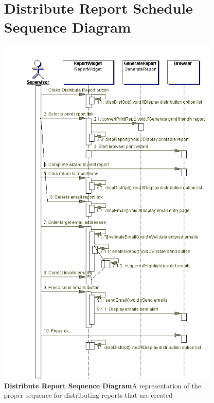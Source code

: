 \documentclass[letterpaper,12pt]{report}
\begin{document}
\begin{figure}[hbp]
 \section{Distribute Report Schedule Sequence Diagram}
 \includegraphics[scale=0.8]{externals/DistributeReportSequence.png}
 \caption{\small
\textbf{Distribute Report Sequence Diagram}\newline A representation of the proper sequence for distributing reports that are created}\label{fig:seqAccessSched}
\end{figure}
\newpage
\end{document}
